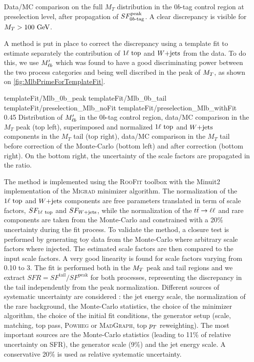                      {Data/MC comparison on the full $M_T$ distribution in the $0b$-tag control region at preselection level, after propagation of $SF_{0b\text{-tag}}^{\text{peak}}$. A clear discrepancy is visible for $M_T > 100 ~\text{GeV}$.}

        A method is put in place to correct the discrepancy using a template fit to estimate separately the contribution of $1\ell~\text{top}$ and $\text{$W$+jets}$ from the data. To do this, we use $M'_{\ell b}$ which was found to have a good discriminating power between the two process categories and being well discribed in the peak of $M_T$, as shown on \ref{fig:MlbPrimeForTemplateFit}.

                          {templateFit/Mlb_0b_peak}
                          {templateFit/Mlb_0b_tail}
                          {templateFit/preselection_Mlb_noFit}
                          {templateFit/preselection_Mlb_withFit}
                          {0.45}
                          {Distribution of $M'_{\ell b}$ in the $0b$-tag control region, data/MC comparison in the $M_T$ peak (top left), superimposed and normalized $1\ell~\text{top}$ and $\text{$W$+jets}$ components in the $M_T$ tail (top right), data/MC comparison in the $M_T$ tail before correction of the Monte-Carlo (bottom left) and after correction (bottom right). On the bottom right, the uncertainty of the scale factors are propagated in the ratio.}

        The method is implemented using the \textsc{RooFit} toolbox with the Minuit2 implementation of the \textsc{Migrad} minimizer algorithm. The normalization of the $1\ell~\text{top}$ and $\text{$W$+jets}$ components are free parameters translated in term of scale factors, $SF_{1\ell~\text{top}}$ and $SF_{\text{$W$+jets}}$, while the normalization of the $t\bar{t} \rightarrow \ell \ell$ and rare components are taken from the Monte-Carlo and constrained with a 20\% uncertainty during the fit process. To validate the method, a closure test is performed by generating toy data from the Monte-Carlo where arbitrary scale factors where injected. The estimated scale factors are then compared to the input scale factors. A very good linearity is found for scale factors varying from 0.10 to 3. The fit is performed both in the $M_T$ peak and tail regions and we extract $SFR = SF^{\text{tail}} / SF^{\text{peak}}$ for both processes, representing the discrepancy in the tail independently from the peak normalization. Different sources of systematic uncertainty are considered : the jet energy scale, the normalization of the rare background, the Monte-Carlo statistics, the choice of the minimizer algorithm, the choice of the initial fit conditions, the generator setup (scale, matching, top pass, \textsc{Powheg} or \textsc{MadGraph}, top $p_T$ reweighting). The most important sources are the Monte-Carlo statistics (leading to 11\% of relative uncertainty on SFR), the generator scale (9\%) and the jet energy scale. A conservative 20\% is used as relative systematic uncertainty.

